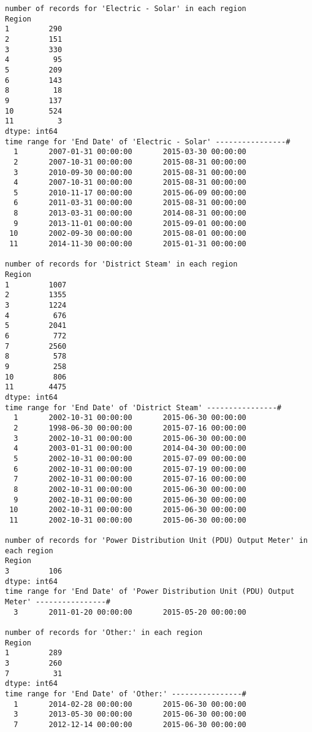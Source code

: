 \documentclass[12pt]{article}
\begin{document}
\begin{verbatim}
number of records for 'Electric - Solar' in each region
Region
1         290
2         151
3         330
4          95
5         209
6         143
8          18
9         137
10        524
11          3
dtype: int64
time range for 'End Date' of 'Electric - Solar' ----------------#
  1       2007-01-31 00:00:00       2015-03-30 00:00:00
  2       2007-10-31 00:00:00       2015-08-31 00:00:00
  3       2010-09-30 00:00:00       2015-08-31 00:00:00
  4       2007-10-31 00:00:00       2015-08-31 00:00:00
  5       2010-11-17 00:00:00       2015-06-09 00:00:00
  6       2011-03-31 00:00:00       2015-08-31 00:00:00
  8       2013-03-31 00:00:00       2014-08-31 00:00:00
  9       2013-11-01 00:00:00       2015-09-01 00:00:00
 10       2002-09-30 00:00:00       2015-08-01 00:00:00
 11       2014-11-30 00:00:00       2015-01-31 00:00:00

number of records for 'District Steam' in each region
Region
1         1007
2         1355
3         1224
4          676
5         2041
6          772
7         2560
8          578
9          258
10         806
11        4475
dtype: int64
time range for 'End Date' of 'District Steam' ----------------#
  1       2002-10-31 00:00:00       2015-06-30 00:00:00
  2       1998-06-30 00:00:00       2015-07-16 00:00:00
  3       2002-10-31 00:00:00       2015-06-30 00:00:00
  4       2003-01-31 00:00:00       2014-04-30 00:00:00
  5       2002-10-31 00:00:00       2015-07-09 00:00:00
  6       2002-10-31 00:00:00       2015-07-19 00:00:00
  7       2002-10-31 00:00:00       2015-07-16 00:00:00
  8       2002-10-31 00:00:00       2015-06-30 00:00:00
  9       2002-10-31 00:00:00       2015-06-30 00:00:00
 10       2002-10-31 00:00:00       2015-06-30 00:00:00
 11       2002-10-31 00:00:00       2015-06-30 00:00:00

number of records for 'Power Distribution Unit (PDU) Output Meter' in each region
Region
3         106
dtype: int64
time range for 'End Date' of 'Power Distribution Unit (PDU) Output Meter' ----------------#
  3       2011-01-20 00:00:00       2015-05-20 00:00:00

number of records for 'Other:' in each region
Region
1         289
3         260
7          31
dtype: int64
time range for 'End Date' of 'Other:' ----------------#
  1       2014-02-28 00:00:00       2015-06-30 00:00:00
  3       2013-05-30 00:00:00       2015-06-30 00:00:00
  7       2012-12-14 00:00:00       2015-06-30 00:00:00
\end{verbatim}
\newpage
 
\end{document}
